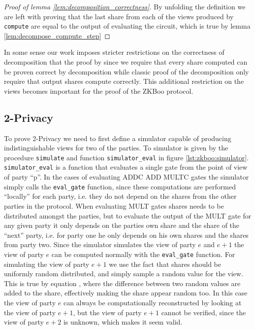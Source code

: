\begin{proof}[Proof of lemma \ref{lem:decomposition_correctness}]
  By unfolding the definition we are left with proving that the last share from
  each of the views produced by \texttt{compute} are equal to the output of
  evaluating the circuit, which is true by lemma \ref{lem:decompose_compute_step}
\end{proof}

In some sense our work imposes stricter restrictions on the correctness of decomposition that
the proof by \citet{zkboo} since we require that every share computed can be
proven correct by decomposition while classic proof of the decomposition only
require that output shares compute correctly. This additional restriction on the
views becomes important for the proof of the ZKBoo protocol.

\subsection{2-Privacy}
\label{sec:decomp_privacy}
To prove 2-Privacy we need to first define a simulator capable of producing
indistinguishable views for two of the parties. To simulator is given by the
procedure \texttt{simulate} and function \texttt{simulator\_eval} in figure \ref{lst:zkboo:simulator}.
\texttt{simulator\_eval} is a function that evaluates a single gate from the
point of view of party ``p''. In the cases of evaluating ADDC ADD MULTC gates
the simulator simply calls the \texttt{eval\_gate} function, since these
computations are performed ``locally'' for each party, i.e. they do not depend
on the shares from the other parties in the protocol.
When evaluating MULT gates shares needs to be distributed amongst the parties,
but to evaluate the output of the MULT gate for any given party it only depends
on the parties own share and the share of the ``next'' party, i.e. for party one
he only depends on his own shares and the shares from party two. Since
the simulator simulates the view of party $e$ and $e+1$ the view of party $e$
can be computed normally with the \texttt{eval\_gate} function. For simulating
the view of party $e+1$ we use the fact that shares should be uniformly random
distributed, and simply sample a random value for the view.
This is true by equation , where
the difference between two random values are added to the share, effectively
making the share appear random too.
In this case the view of party $e$ can always be computationally reconstructed
by looking at the view of party $e+1$, but the view of party $e+1$ cannot be
verified, since the view of party $e+2$ is unknown, which makes it seem valid.


